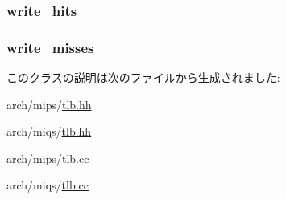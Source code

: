 \label{classMipsISA_1_1TLB_a764f5ef97bfcb1ba3ad05704de5a3a32}
\hypertarget{classMipsISA_1_1TLB_ab3172bfd014e75dcad1b0a2a91de59dd}{
\subsubsection[{write\_\-hits}]{ {\bf write\_\-hits}}}
\label{classMipsISA_1_1TLB_ab3172bfd014e75dcad1b0a2a91de59dd}
\hypertarget{classMipsISA_1_1TLB_af8519a07f8f1f76c8fff9c9a1aaa4638}{
\subsubsection[{write\_\-misses}]{ {\bf write\_\-misses}}}
\label{classMipsISA_1_1TLB_af8519a07f8f1f76c8fff9c9a1aaa4638}


このクラスの説明は次のファイルから生成されました:\begin{DoxyCompactItemize}
\item 
arch/mips/\hyperlink{arch_2mips_2tlb_8hh}{tlb.hh}\item 
arch/miqs/\hyperlink{arch_2miqs_2tlb_8hh}{tlb.hh}\item 
arch/mips/\hyperlink{arch_2mips_2tlb_8cc}{tlb.cc}\item 
arch/miqs/\hyperlink{arch_2miqs_2tlb_8cc}{tlb.cc}\end{DoxyCompactItemize}
